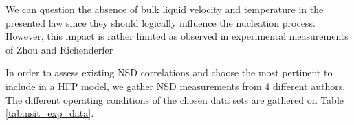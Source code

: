 \begin{remark*}{}
We can question the absence of bulk liquid velocity and temperature in the presented law since they should logically influence the nucleation process. However, this impact is rather limited as observed in experimental measurements of Zhou \etal and Richenderfer \etal
\end{remark*}

\npar

In order to assess existing NSD correlations and choose the most pertinent to include in a HFP model, we gather NSD measurements from 4 different authors. The different operating conditions of the chosen data sets are gathered on Table \ref{tab:nsit_exp_data}.


\begin{table}[h!]


\noindent{}

\caption{Nucleation Site Density data in flow boiling}
\label{tab:nsit_exp_data}


\end{table}



